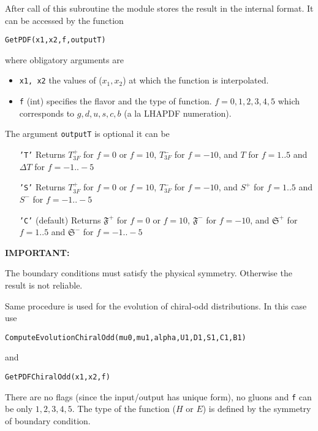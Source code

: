 \documentclass[prd,nofootinbib,eqsecnum,final]{revtex4}
\renewcommand{\(}{\left(}
\renewcommand{\)}{\right)}
\renewcommand{\[}{\left[}
\renewcommand{\]}{\right]}
\newcommand{\red}[1]{{\color[rgb]{1,0,0} #1}}
\begin{document}
After call of this subroutine the module stores the result in the internal format. It can be accessed by the function
\begin{center}
\texttt{GetPDF(x1,x2,f,outputT)}
\end{center}
where obligatory arguments are
\begin{itemize}
\item \texttt{x1, x2} the values of ($x_1,x_2$) at which the function is interpolated.
\item \texttt{f} (int) specifies the flavor and the type of function. $f=0,1,2,3,4,5$ which corresponds to $g, d, u, s, c, b$ (a la LHAPDF numeration).
\end{itemize}
The argument \texttt{outputT} is optional it can be
\begin{itemize}
\item[\texttt{'T'}] Returns $T^+_{3F}$ for $f=0$ or $f=10$, $T^-_{3F}$ for $f=-10$, and $T$ for $f=1..5$ and $\Delta T$ for $f=-1..-5$
\item[\texttt{'S'}] Returns $T^+_{3F}$ for $f=0$ or $f=10$, $T^-_{3F}$ for $f=-10$, and $S^+$ for $f=1..5$ and $S^-$ for $f=-1..-5$
\item[\texttt{'C'}] (default) Returns $\mathfrak{F}^+$ for $f=0$ or $f=10$, $\mathfrak{F}^-$ for $f=-10$, and $\mathfrak{S}^+$ for $f=1..5$ and $\mathfrak{S}^-$ for $f=-1..-5$
\end{itemize}

\begin{tcolorbox}
\begin{center}
\textbf{\red{IMPORTANT:}}

The boundary conditions must satisfy the physical symmetry. Otherwise the result is not reliable.
\end{center}
\end{tcolorbox}

Same procedure is used for the evolution of chiral-odd distributions. In this case use
\begin{center}
\texttt{ComputeEvolutionChiralOdd(mu0,mu1,alpha,U1,D1,S1,C1,B1)}
\end{center}
and
\begin{center}
\texttt{GetPDFChiralOdd(x1,x2,f)}
\end{center}
There are no flags (since the input/output has unique form), no gluons and \texttt{f} can be only $1,2,3,4,5$. The type of the function ($H$ or $E$) is defined by the symmetry of boundary condition.
\end{document}
